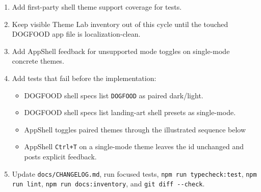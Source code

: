 \begin{enumerate}
\def\labelenumi{\arabic{enumi}.}
\tightlist
\item
  Add first-party shell theme support coverage for tests.
\item
  Keep visible Theme Lab inventory out of this cycle until the touched DOGFOOD app file is localization-clean.
\item
  Add AppShell feedback for unsupported mode toggles on single-mode concrete themes.
\item
  Add tests that fail before the implementation:

  \begin{itemize}
  \tightlist
  \item
    DOGFOOD shell specs list \texttt{D\allowbreak{}O\allowbreak{}G\allowbreak{}F\allowbreak{}O\allowbreak{}O\allowbreak{}D} as paired dark/light.
  \item
    DOGFOOD shell specs list landing-art shell presets as single-mode.
  \item
    AppShell toggles paired themes through the illustrated sequence below
  \item
    AppShell \texttt{C\allowbreak{}t\allowbreak{}r\allowbreak{}l\allowbreak{}+\allowbreak{}T} on a single-mode theme leaves the id unchanged and posts explicit feedback.
  \end{itemize}
\item
  Update \texttt{d\allowbreak{}o\allowbreak{}c\allowbreak{}s\allowbreak{}/\allowbreak{}C\allowbreak{}H\allowbreak{}A\allowbreak{}N\allowbreak{}G\allowbreak{}E\allowbreak{}L\allowbreak{}O\allowbreak{}G\allowbreak{}.\allowbreak{}m\allowbreak{}d}, run focused tests, \texttt{n\allowbreak{}p\allowbreak{}m\allowbreak{} \allowbreak{}r\allowbreak{}u\allowbreak{}n\allowbreak{} \allowbreak{}t\allowbreak{}y\allowbreak{}p\allowbreak{}e\allowbreak{}c\allowbreak{}h\allowbreak{}e\allowbreak{}c\allowbreak{}k\allowbreak{}:\allowbreak{}t\allowbreak{}e\allowbreak{}s\allowbreak{}t}, \texttt{n\allowbreak{}p\allowbreak{}m\allowbreak{} \allowbreak{}r\allowbreak{}u\allowbreak{}n\allowbreak{} \allowbreak{}l\allowbreak{}i\allowbreak{}n\allowbreak{}t}, \texttt{n\allowbreak{}p\allowbreak{}m\allowbreak{} \allowbreak{}r\allowbreak{}u\allowbreak{}n\allowbreak{} \allowbreak{}d\allowbreak{}o\allowbreak{}c\allowbreak{}s\allowbreak{}:\allowbreak{}i\allowbreak{}n\allowbreak{}v\allowbreak{}e\allowbreak{}n\allowbreak{}t\allowbreak{}o\allowbreak{}r\allowbreak{}y}, and \texttt{g\allowbreak{}i\allowbreak{}t\allowbreak{} \allowbreak{}d\allowbreak{}i\allowbreak{}f\allowbreak{}f\allowbreak{} \allowbreak{}-\allowbreak{}-\allowbreak{}c\allowbreak{}h\allowbreak{}e\allowbreak{}c\allowbreak{}k}.
\end{enumerate}

